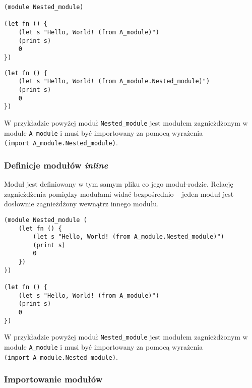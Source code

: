 \begin{small}
\begin{lstlisting}[caption={Plik \texttt{src/A\_module.lisp}}]
(module Nested_module)

(let fn () {
    (let s "Hello, World! (from A_module)")
    (print s)
    0
})
\end{lstlisting}
\end{small}

\begin{small}
\begin{lstlisting}[caption={Plik \texttt{src/A\_module/Nested\_module.lisp}}]
(let fn () {
    (let s "Hello, World! (from A_module.Nested_module)")
    (print s)
    0
})
\end{lstlisting}
\end{small}

W przykładzie powyżej moduł \texttt{Nested\_module} jest modułem zagnieżdżonym
w module \texttt{A\_module} i musi być importowany za pomocą wyrażenia
\texttt{(import~A\_module.Nested\_module)}.

\subsubsection{Definicje modułów \emph{inline}}
\label{viuact_spec_module_definition_inline}

Moduł jest definiowany w tym samym pliku co jego moduł-rodzic. Relację
zagnieżdżenia pomiędzy modułami widać bezpośrednio -- jeden moduł jest dosłownie
zagnieżdżony wewnątrz innego modułu.

\begin{small}
\begin{lstlisting}[caption={Plik \texttt{src/A\_module.lisp}}]
(module Nested_module (
    (let fn () {
        (let s "Hello, World! (from A_module.Nested_module)")
        (print s)
        0
    })
))

(let fn () {
    (let s "Hello, World! (from A_module)")
    (print s)
    0
})
\end{lstlisting}
\end{small}

W przykładzie powyżej moduł \texttt{Nested\_module} jest modułem zagnieżdżonym
w module \texttt{A\_module} i musi być importowany za pomocą wyrażenia
\texttt{(import~A\_module.Nested\_module)}.

\subsubsection{Importowanie modułów}
\label{viuact_spec_module_import}

